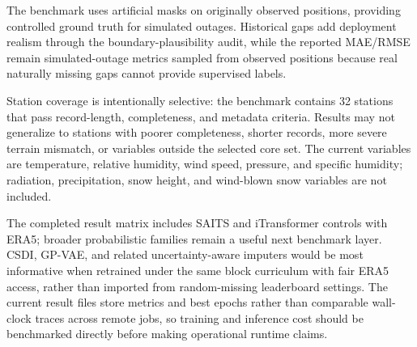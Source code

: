 The benchmark uses artificial masks on originally observed positions, providing controlled ground truth for simulated outages. Historical gaps add deployment realism through the boundary-plausibility audit, while the reported MAE/RMSE remain simulated-outage metrics sampled from observed positions because real naturally missing gaps cannot provide supervised labels.

Station coverage is intentionally selective: the benchmark contains 32 stations that pass record-length, completeness, and metadata criteria. Results may not generalize to stations with poorer completeness, shorter records, more severe terrain mismatch, or variables outside the selected core set. The current variables are temperature, relative humidity, wind speed, pressure, and specific humidity; radiation, precipitation, snow height, and wind-blown snow variables are not included.

The completed result matrix includes SAITS and iTransformer controls with ERA5; broader probabilistic families remain a useful next benchmark layer. CSDI, GP-VAE, and related uncertainty-aware imputers would be most informative when retrained under the same block curriculum with fair ERA5 access, rather than imported from random-missing leaderboard settings. The current result files store metrics and best epochs rather than comparable wall-clock traces across remote jobs, so training and inference cost should be benchmarked directly before making operational runtime claims.
